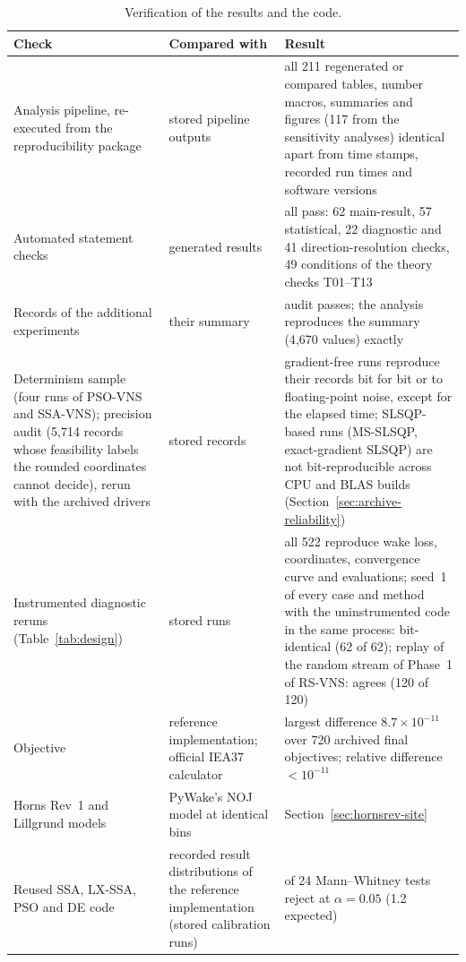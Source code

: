 \begin{table}[!htb]
\centering
\caption{Verification of the results and the code.}
\label{tab:verification}
\scriptsize
\setlength{\tabcolsep}{3pt}
\begin{tabular}{@{}>{\raggedright\arraybackslash}p{4.0cm}>{\raggedright\arraybackslash}p{3.6cm}>{\raggedright\arraybackslash}p{6.6cm}@{}}
\toprule
Check & Compared with & Result \\
\midrule
Analysis pipeline, re-executed from the reproducibility package & stored pipeline outputs & all 211 regenerated or compared tables, number macros, summaries and figures (117 from the sensitivity analyses) identical apart from time stamps, recorded run times and software versions \\
Automated statement checks & generated results & all pass: 62 main-result, 57 statistical, 22 diagnostic and 41 direction-resolution checks, 49 conditions of the theory checks T01--T13 \\
Records of the additional experiments & their summary & audit passes; the analysis reproduces the summary (4{,}670 values) exactly \\
Determinism sample (four runs of PSO-VNS and SSA-VNS); precision audit (5{,}714 records whose feasibility labels the rounded coordinates cannot decide), rerun with the archived drivers & stored records & gradient-free runs reproduce their records bit for bit or to floating-point noise, except for the elapsed time; SLSQP-based runs (MS-SLSQP, exact-gradient SLSQP) are not bit-reproducible across CPU and BLAS builds (Section~\ref{sec:archive-reliability}) \\
Instrumented diagnostic reruns (Table~\ref{tab:design}) & stored runs & all 522 reproduce wake loss, coordinates, convergence curve and evaluations; seed~1 of every case and method with the uninstrumented code in the same process: bit-identical (62 of 62); replay of the random stream of Phase~1 of RS-VNS: agrees (120 of 120) \\
Objective & reference implementation; official IEA37 calculator & largest difference $8.7\times10^{-11}$ over 720 archived final objectives; relative difference ${<}10^{-11}$ \\
Horns Rev~1 and Lillgrund models & PyWake's NOJ model at identical bins & Section~\ref{sec:hornsrev-site} \\
Reused SSA, LX-SSA, PSO and DE code & recorded result distributions of the reference implementation (stored calibration runs) & 2 of 24 Mann--Whitney tests reject at $\alpha=0.05$ (1.2 expected) \\
\bottomrule
\end{tabular}
\end{table}

